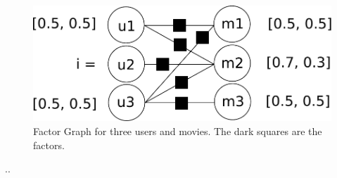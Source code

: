 \begin{figure}[h]\centering
    \includegraphics[scale=0.33]{graphics/top-n-graph.pdf}
  \caption{Factor Graph for three users and movies. The dark squares are the factors. \label{top_n_graph}}
\end{figure}


..

%
%
%
